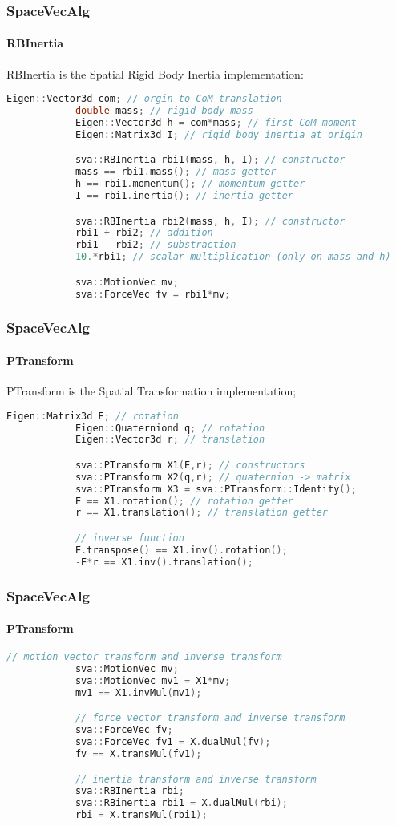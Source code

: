 \documentclass{beamer}
\begin{document}
  	\begin{frame}[fragile]
		\frametitle{SpaceVecAlg}
		\framesubtitle{RBInertia}
		RBInertia is the Spatial Rigid Body Inertia implementation:
		\begin{lstlisting}[language=C++]
			Eigen::Vector3d com; // orgin to CoM translation
			double mass; // rigid body mass
			Eigen::Vector3d h = com*mass; // first CoM moment
			Eigen::Matrix3d I; // rigid body inertia at origin

			sva::RBInertia rbi1(mass, h, I); // constructor
			mass == rbi1.mass(); // mass getter
			h == rbi1.momentum(); // momentum getter
			I == rbi1.inertia(); // inertia getter

			sva::RBInertia rbi2(mass, h, I); // constructor
			rbi1 + rbi2; // addition
			rbi1 - rbi2; // substraction
			10.*rbi1; // scalar multiplication (only on mass and h)

			sva::MotionVec mv;
			sva::ForceVec fv = rbi1*mv;
		\end{lstlisting}
	\end{frame}


  	\begin{frame}[fragile]
		\frametitle{SpaceVecAlg}
		\framesubtitle{PTransform}
		PTransform is the Spatial Transformation implementation;
		\begin{lstlisting}[language=C++]
			Eigen::Matrix3d E; // rotation
			Eigen::Quaterniond q; // rotation
			Eigen::Vector3d r; // translation

			sva::PTransform X1(E,r); // constructors
			sva::PTransform X2(q,r); // quaternion -> matrix
			sva::PTransform X3 = sva::PTransform::Identity();
			E == X1.rotation(); // rotation getter
			r == X1.translation(); // translation getter

			// inverse function
			E.transpose() == X1.inv().rotation();
			-E*r == X1.inv().translation();
		\end{lstlisting}
	\end{frame}
  	\begin{frame}[fragile]
		\frametitle{SpaceVecAlg}
		\framesubtitle{PTransform}
		\begin{lstlisting}[language=C++]
			// motion vector transform and inverse transform
			sva::MotionVec mv;
			sva::MotionVec mv1 = X1*mv;
			mv1 == X1.invMul(mv1);

			// force vector transform and inverse transform
			sva::ForceVec fv;
			sva::ForceVec fv1 = X.dualMul(fv);
			fv == X.transMul(fv1);

			// inertia transform and inverse transform
			sva::RBInertia rbi;
			sva::RBinertia rbi1 = X.dualMul(rbi);
			rbi = X.transMul(rbi1);
		\end{lstlisting}
	\end{frame}
\end{document}
